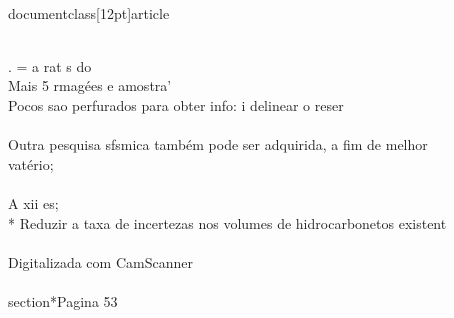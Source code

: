 \\documentclass[12pt]{article}
\begin{document}
\\
. = a rat s do\\
Mais 5 rmagées e amostra'\\
Pocos sao perfurados para obter info: i delinear o reser\\
\\
Outra pesquisa sfsmica também pode ser adquirida, a fim de melhor\\
vatério;\\
\\
A xii es;\\
* Reduzir a taxa de incertezas nos volumes de hidrocarbonetos existent\\
\\
Digitalizada com CamScanner\\

\\section*{Pagina 53}
\end{document}
